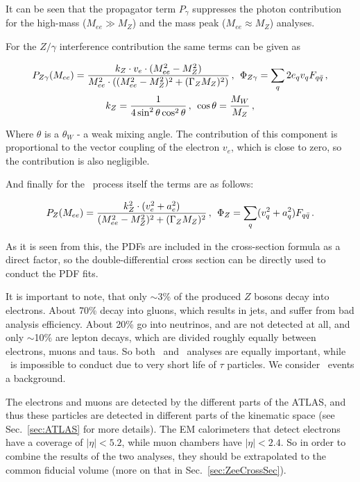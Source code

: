 It can be seen that the propagator term $P_{\gamma}$ suppresses the photon contribution for the high-mass ($M_{ee} \gg M_{Z}$) and the mass peak ($M_{ee} \approx M_{Z}$) analyses.

For the $Z/\gamma$ interference contribution the same terms can be given as

\begin{equation}
\begin{gathered}
P_{Z\gamma}(M_{ee}) = \frac{k_{Z} \cdot v_{e} \cdot (M_{ee}^{2} - M_{Z}^{2})}{M_{ee}^{2} \cdot ((M_{ee}^{2} - M_{Z}^{2})^{2} + (\Gamma_{Z}M_{Z})^{2})}\,,\,\;
\Phi_{Z\gamma} = \sum_{q} 2e_{q}v_{q} F_{q\bar{q}} \,,\\
k_{Z} = \frac{1}{4\sin^{2}\theta\cos^{2}\theta} \,, \,\; \cos\theta = \frac{M_{W}}{M_{Z}} \,,
\end{gathered}
\end{equation}

Where $\theta$ is a $\theta_{W}$ - a weak mixing angle. The contribution of this component is proportional to the vector coupling of the electron $v_{e}$, which is close to zero, so the contribution is also negligible.

And finally for the \Zee\ process itself the terms are as follows:

\begin{equation}
P_{Z}(M_{ee}) = \frac{k^{2}_{Z} \cdot (v^{2}_{e} + a^{2}_{e})}{(M^{2}_{ee} - M^{2}_{Z})^{2} + (\Gamma_{Z}M_{Z})^{2}}\,,\,\;
\Phi_{Z} = \sum_{q} (v^{2}_{q} + a^{2}_{q}) F_{q\bar{q}} \,.
\end{equation}

As it is seen from this, the PDFs are included in the cross-section formula as a direct factor, so the double-differential cross section can be directly used to conduct the PDF fits.

It is important to note, that only $\sim$3\% of the produced $Z$ bosons decay into electrons. About 70\% decay into gluons, which results in jets, and suffer from bad analysis efficiency. About 20\% go into neutrinos, and are not detected at all, and only $\sim$10\% are lepton decays, which are divided roughly equally between electrons, muons and taus. So both \Zee\ and \Zmm\ analyses are equally important, while \Ztau\ is impossible to conduct due to very short life of $\tau$ particles. We consider \Ztau\ events a background.

The electrons and muons are detected by the different parts of the ATLAS, and thus these particles are detected in different parts of the kinematic space (see Sec.~\ref{sec:ATLAS} for more details). The EM calorimeters that detect electrons have a coverage of $|\eta| < 5.2$, while muon chambers have $|\eta| < 2.4$. So in order to combine the results of the two analyses, they should be extrapolated to the common fiducial volume (more on that in Sec.~\ref{sec:ZeeCrossSec}).
